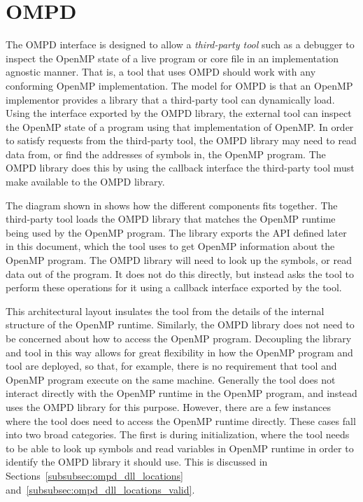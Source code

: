 \section{OMPD}
\label{sec:ompd-overview}
\label{sec:third-party-tool-callback-interface}

The OMPD interface is designed to allow a \emph{third-party tool}
such as a debugger to inspect the OpenMP state of a live program
or core file in an implementation agnostic manner.
That is, a tool that uses OMPD should work with any conforming
OpenMP implementation.
The model for OMPD is that an OpenMP implementor provides a
library that a third-party tool can dynamically load.
Using the interface exported by the OMPD library, the external tool can
inspect the OpenMP state of a program using that implementation of OpenMP.
In order to satisfy requests from the third-party tool, the OMPD library
may need to read data from, or find the addresses of symbols in,
the OpenMP program.
The OMPD library does this by using the callback interface the third-party
tool must make available to the OMPD library.

%


The diagram shown in   shows how the different
components fits together.
The third-party tool loads the OMPD library that matches the OpenMP runtime
being used by the OpenMP program.
The library exports the API defined later in this document,
which the tool uses to get OpenMP information about the OpenMP program.
The OMPD library will need to look up the symbols,
or read data out of the program.
It does not do this directly, but instead asks the tool to perform
these operations for it using a callback interface exported by the tool.

This architectural layout insulates the tool from the details
of the internal structure of the OpenMP runtime.
Similarly, the OMPD library does not need to be concerned about
how to access the OpenMP program.
Decoupling the library and tool in this way allows for
great flexibility in how the OpenMP program and tool are deployed,
so that, for example, there is no requirement that tool
and OpenMP program execute on the same machine.
Generally the tool does not interact directly with the OpenMP
runtime in the OpenMP program, and instead uses the OMPD library
for this purpose.
However, there are a few instances where the tool does need
to access the OpenMP runtime directly.
These cases fall into two broad categories.
The first is during initialization, where the tool needs
to be able to look up symbols and read variables in OpenMP runtime
in order to identify the OMPD library it should use.
This is discussed in Sections~\ref{subsubsec:ompd_dll_locations}
and~\ref{subsubsec:ompd_dll_locations_valid}.

